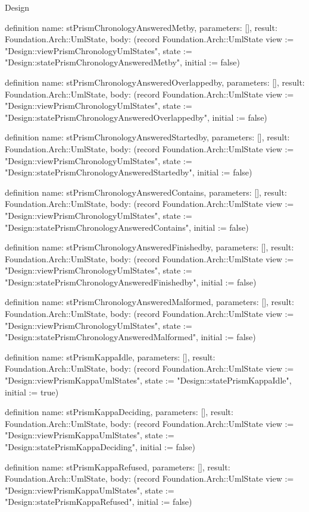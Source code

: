 \begin{lexlean}{Design}
\begin{semanticmodule}
definition{
  name: stPrismChronologyAnsweredMetby,
  parameters: [],
  result: Foundation.Arch::UmlState,
  body: (record Foundation.Arch::UmlState {view := "Design::viewPrismChronologyUmlStates", state := "Design::statePrismChronologyAnsweredMetby", initial := false})
}

definition{
  name: stPrismChronologyAnsweredOverlappedby,
  parameters: [],
  result: Foundation.Arch::UmlState,
  body: (record Foundation.Arch::UmlState {view := "Design::viewPrismChronologyUmlStates", state := "Design::statePrismChronologyAnsweredOverlappedby", initial := false})
}

definition{
  name: stPrismChronologyAnsweredStartedby,
  parameters: [],
  result: Foundation.Arch::UmlState,
  body: (record Foundation.Arch::UmlState {view := "Design::viewPrismChronologyUmlStates", state := "Design::statePrismChronologyAnsweredStartedby", initial := false})
}

definition{
  name: stPrismChronologyAnsweredContains,
  parameters: [],
  result: Foundation.Arch::UmlState,
  body: (record Foundation.Arch::UmlState {view := "Design::viewPrismChronologyUmlStates", state := "Design::statePrismChronologyAnsweredContains", initial := false})
}

definition{
  name: stPrismChronologyAnsweredFinishedby,
  parameters: [],
  result: Foundation.Arch::UmlState,
  body: (record Foundation.Arch::UmlState {view := "Design::viewPrismChronologyUmlStates", state := "Design::statePrismChronologyAnsweredFinishedby", initial := false})
}

definition{
  name: stPrismChronologyAnsweredMalformed,
  parameters: [],
  result: Foundation.Arch::UmlState,
  body: (record Foundation.Arch::UmlState {view := "Design::viewPrismChronologyUmlStates", state := "Design::statePrismChronologyAnsweredMalformed", initial := false})
}

definition{
  name: stPrismKappaIdle,
  parameters: [],
  result: Foundation.Arch::UmlState,
  body: (record Foundation.Arch::UmlState {view := "Design::viewPrismKappaUmlStates", state := "Design::statePrismKappaIdle", initial := true})
}

definition{
  name: stPrismKappaDeciding,
  parameters: [],
  result: Foundation.Arch::UmlState,
  body: (record Foundation.Arch::UmlState {view := "Design::viewPrismKappaUmlStates", state := "Design::statePrismKappaDeciding", initial := false})
}

definition{
  name: stPrismKappaRefused,
  parameters: [],
  result: Foundation.Arch::UmlState,
  body: (record Foundation.Arch::UmlState {view := "Design::viewPrismKappaUmlStates", state := "Design::statePrismKappaRefused", initial := false})
}


\end{semanticmodule}
\end{lexlean}
